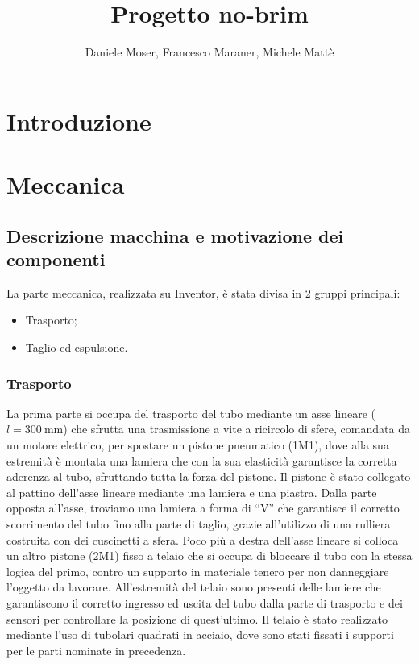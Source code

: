 \documentclass{report}
\title{Progetto no-brim}
\author{Daniele Moser, Francesco Maraner, Michele Mattè}
\begin{document}
\maketitle
\tableofcontents

\chapter{Introduzione}

\chapter{Meccanica}


\section{Descrizione macchina e motivazione dei componenti}
La parte meccanica, realizzata su Inventor, è stata divisa in 2 gruppi principali:
\begin{itemize}
\item Trasporto;
\item Taglio ed espulsione.
\end{itemize}

\subsection{Trasporto}
La prima parte si occupa del trasporto del tubo mediante un asse lineare ($l=\SI{300}{\mm}$) che sfrutta una trasmissione a vite a ricircolo di sfere, comandata da un motore elettrico, per spostare un pistone pneumatico (1M1), dove alla sua estremità è montata una lamiera che con la sua elasticità garantisce la corretta aderenza al tubo, sfruttando tutta la forza del pistone. Il pistone è stato collegato al pattino dell’asse lineare mediante una lamiera e una piastra. Dalla parte opposta all’asse, troviamo una lamiera a forma di “V” che garantisce il corretto scorrimento del tubo fino alla parte di taglio, grazie all’utilizzo di una rulliera costruita con dei cuscinetti a sfera.
Poco più a destra dell’asse lineare si colloca un altro pistone (2M1) fisso a telaio che si occupa di bloccare il tubo con la stessa logica del primo, contro un supporto in materiale tenero per non danneggiare l’oggetto da lavorare.
All’estremità del telaio sono presenti delle lamiere che garantiscono il corretto ingresso ed uscita del tubo dalla parte di trasporto e dei sensori per controllare la posizione di quest’ultimo. Il telaio è stato realizzato mediante l’uso di tubolari quadrati in acciaio, dove sono stati fissati i supporti per le parti nominate in precedenza.
\end{document}
